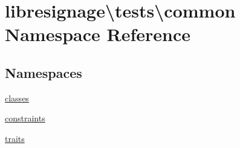 \hypertarget{namespacelibresignage_1_1tests_1_1common}{}\section{libresignage\textbackslash{}tests\textbackslash{}common Namespace Reference}
\label{namespacelibresignage_1_1tests_1_1common}
\subsection*{Namespaces}
\begin{DoxyCompactItemize}
\item 
 \hyperlink{namespacelibresignage_1_1tests_1_1common_1_1classes}{classes}
\item 
 \hyperlink{namespacelibresignage_1_1tests_1_1common_1_1constraints}{constraints}
\item 
 \hyperlink{namespacelibresignage_1_1tests_1_1common_1_1traits}{traits}
\end{DoxyCompactItemize}
